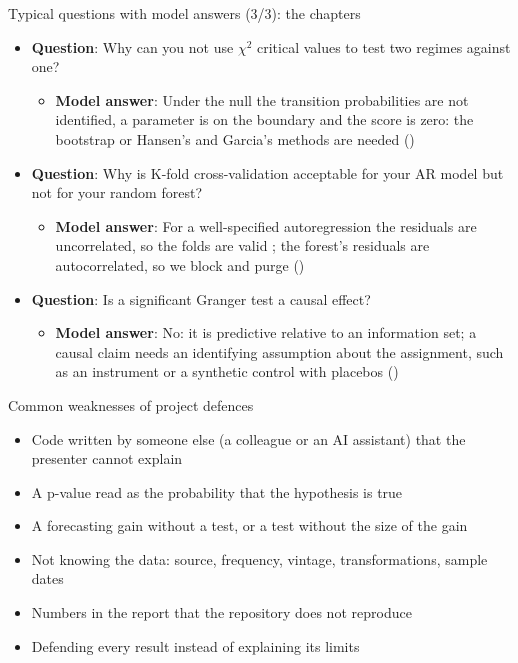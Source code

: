 \begin{frame}{Typical questions with model answers (3/3): the chapters}
\itemsize{\footnotesize}
\begin{itemize}
    \item \textbf{Question}: Why can you not use $\chi^2$ critical values to test two regimes against one?
    \begin{itemize}
        \item \textbf{Model answer}: Under the null the transition probabilities are not identified, a parameter is on the boundary and the score is zero: the bootstrap or Hansen's and Garcia's methods are needed ()
    \end{itemize}
    \item \textbf{Question}: Why is K-fold cross-validation acceptable for your AR model but not for your random forest?
    \begin{itemize}
        \item \textbf{Model answer}: For a well-specified autoregression the residuals are uncorrelated, so the folds are valid ; the forest's residuals are autocorrelated, so we block and purge ()
    \end{itemize}
    \item \textbf{Question}: Is a significant Granger test a causal effect?
    \begin{itemize}
        \item \textbf{Model answer}: No: it is predictive relative to an information set; a causal claim needs an identifying assumption about the assignment, such as an instrument or a synthetic control with placebos ()
    \end{itemize}
\end{itemize}
\end{frame}

\begin{frame}{Common weaknesses of project defences}
\itemsize{\small}
\begin{itemize}
    \item Code written by someone else (a colleague or an AI assistant) that the presenter cannot explain
    \item A p-value read as the probability that the hypothesis is true
    \item A forecasting gain without a test, or a test without the size of the gain
    \item Not knowing the data: source, frequency, vintage, transformations, sample dates
    \item Numbers in the report that the repository does not reproduce
    \item Defending every result instead of explaining its limits
\end{itemize}
\end{frame}


